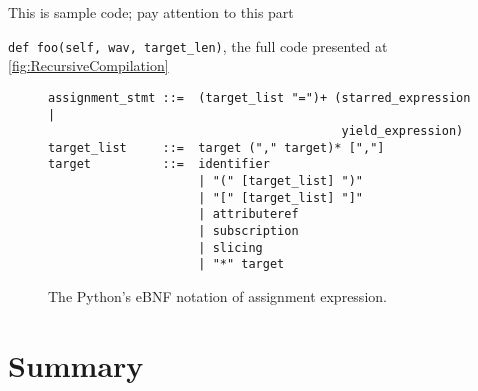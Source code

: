\documentclass[
    bindingoffset=5mm,  %
    footnoteindent=3mm, %
    hyphenation=true    %
]{src/wut-thesis}
\begin{document}
This is sample code; pay attention to this part

\texttt{def foo(self, wav, target_len)},
the full code presented at \ref{fig:RecursiveCompilation}

\begin{figure}%
\begin{verbatim}
assignment_stmt ::=  (target_list "=")+ (starred_expression |
                                         yield_expression)
target_list     ::=  target ("," target)* [","]
target          ::=  identifier
                     | "(" [target_list] ")"
                     | "[" [target_list] "]"
                     | attributeref
                     | subscription
                     | slicing
                     | "*" target
\end{verbatim}
\caption{The Python's eBNF notation of assignment expression.}
\label{fig:PythonExampleRule}
\end{figure}

%
%
\clearpage %
\section{Summary} \label{ch:summary}

\cleardoublepage %
\printbibliography
\clearpage

\acronymlist
{}
\vspace{0.8cm}

\pagestyle{plain}

\listoffigurestoc    %
\vspace{1cm}         %
\listoftablestoc     %
\vspace{1cm}         %
\listofappendicestoc %
\end{document}
